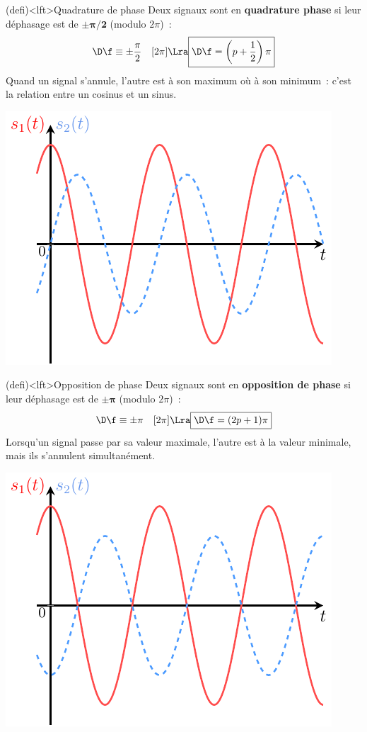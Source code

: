 \documentclass[../../main/main.tex]{subfiles}
\begin{document}
\begin{tcb}[sidebyside, righthand ratio=.25](defi)<lft>{Quadrature de phase}
	Deux signaux sont en \textbf{quadrature phase} si leur déphasage est de
	$\mathbf{\pm\pi/2}$ (modulo $2\pi$)~:
	\[
		\D\f \equiv \pm\frac{\pi}{2} \quad[2\pi]
		\Lra
		\boxed{\D\f = \left( p+\frac{1}{2} \right)\pi}
	\]
	Quand un signal s'annule, l'autre est à son maximum où à son minimum~:
	c'est la relation entre un cosinus et un sinus.
	\tcblower
	\begin{center}
		\includegraphics[width=\linewidth]{dfeqpi2.pdf}
	\end{center}
\end{tcb}

\begin{tcb}[sidebyside, righthand ratio=.25](defi)<lft>{Opposition de phase}
	Deux signaux sont en \textbf{opposition de phase} si leur déphasage est de
	$\mathbf{\pm\pi}$ (modulo $2\pi$)~:
	\[
		\D\f \equiv \pm\pi \quad[2\pi]
		\Lra
		\boxed{\D\f = (2p+1)\pi}
	\]
	Lorsqu'un signal passe par sa valeur maximale, l'autre est à la valeur
	minimale, mais ils s'annulent simultanément.
	\tcblower
	\begin{center}
		\includegraphics[width=\linewidth]{dfeqpi.pdf}
	\end{center}
\end{tcb}
\end{document}
